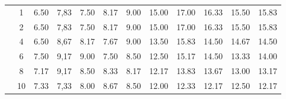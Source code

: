 \begin{table}[H]
\begin{tabular}{|c|c|c c c c c|c c c c c|}
\multicolumn{1}{|c|}{ \multirow{6}{*}{\rotatebox[origin=c]{90}{\textbf{K-vizinhos}}} }
&1	&6.50	&7,83 &7.50&	8.17	&9.00	&15.00	&17.00	&16.33	&15.50&	15.83	\\\cline{2-12}
&2	&6.50	&7,83 &7.50&	8.17	&9.00	&15.00	&17.00	&16.33	&15.50&	15.83	\\\cline{2-12}
&4	&6.50	&8,67 &8.17&	7.67	&9.00	&13.50	&15.83	&14.50	&14.67&	14.50	\\\cline{2-12}
&6	&7.50	&9,17 &9.00&	7.50	&8.50	&12.50	&15.17	&14.50	&13.33&	14.00	\\\cline{2-12}
&8	&7.17	&9,17 &8.50&	8.33	&8.17	&12.17	&13.83	&13.67	&13.00&	13.17	\\\cline{2-12}
&10	&7.33	&7,33 &8.00&	8.67	&8.50	&12.00	&12.33	&12.17	&12.50&	12.17	
\\\midrule





	\end{tabular}
\end{table}




